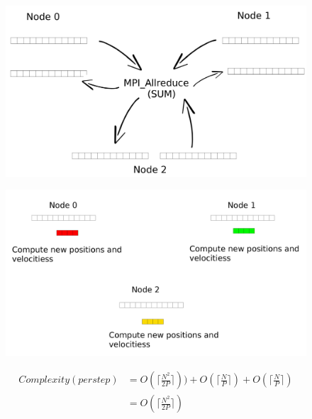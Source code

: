 \documentclass[a4paper]{article}
\begin{document}
\begin{figure}
\centering
\begin{minipage}{.55\textwidth}
  \centering
  \includegraphics[width=1\linewidth]{MPI_all_reduce}
  \label{fig:D1}
\end{minipage}%
\begin{minipage}{.55\textwidth}
  \centering
  \includegraphics[width=1\linewidth]{compute_positions_only}
  \label{fig:E1}
\end{minipage}
\end{figure}
\FloatBarrier

\begin{equation} \label{eq:comp_app2}
\begin{split}
Complexity (per step) & = O(\lceil\frac{N^2}{2P}\rceil)) + O(\lceil\frac{N}{P}\rceil) + O(\lceil\frac{N}{P}\rceil)\\
 & = O(\lceil\frac{N^2}{2P}\rceil)
\end{split}
\end{equation}
\end{document}
